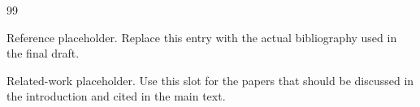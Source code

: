 \begin{thebibliography}{99}

Reference placeholder.
Replace this entry with the actual bibliography used in the final draft.

Related-work placeholder.
Use this slot for the papers that should be discussed in the introduction and cited in the main text.

\end{thebibliography}
